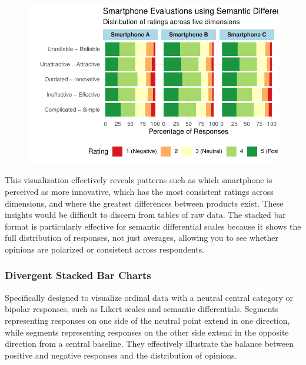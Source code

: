 \documentclass[
  letterpaper,
  DIV=11,
  numbers=noendperiod]{scrartcl}
\begin{document}
\begin{figure}[H]

{\centering \includegraphics{Ordinal_data_an_R_files/figure-pdf/unnamed-chunk-3-1.pdf}

}

\end{figure}

This visualization effectively reveals patterns such as which smartphone
is perceived as more innovative, which has the most consistent ratings
across dimensions, and where the greatest differences between products
exist. These insights would be difficult to discern from tables of raw
data. The stacked bar format is particularly effective for semantic
differential scales because it shows the full distribution of responses,
not just averages, allowing you to see whether opinions are polarized or
consistent across respondents.

\hypertarget{divergent-stacked-bar-charts}{%
\subsubsection*{Divergent Stacked Bar
Charts}\label{divergent-stacked-bar-charts}}

Specifically designed to visualize ordinal data with a neutral central
category or bipolar responses, such as Likert scales and semantic
differentials. Segments representing responses on one side of the
neutral point extend in one direction, while segments representing
responses on the other side extend in the opposite direction from a
central baseline. They effectively illustrate the balance between
positive and negative responses and the distribution of opinions.
\end{document}
